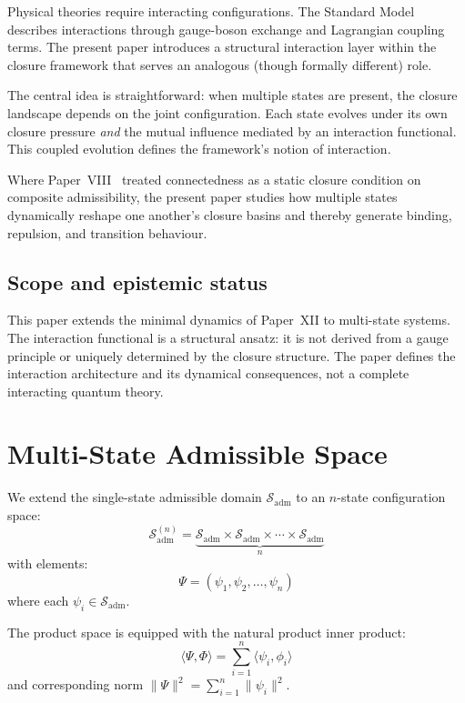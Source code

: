 \documentclass[12pt]{article}
\newcommand{\Sadm}{\mathcal{S}_{\mathrm{adm}}}
\begin{document}
Physical theories require interacting configurations. The Standard Model describes interactions through gauge-boson exchange and Lagrangian coupling terms. The present paper introduces a structural interaction layer within the closure framework that serves an analogous (though formally different) role.

The central idea is straightforward: when multiple states are present, the closure landscape depends on the joint configuration. Each state evolves under its own closure pressure \textit{and} the mutual influence mediated by an interaction functional. This coupled evolution defines the framework's notion of interaction.

Where Paper~VIII~\citep{SmartVIII} treated connectedness as a static closure condition on composite admissibility, the present paper studies how multiple states dynamically reshape one another's closure basins and thereby generate binding, repulsion, and transition behaviour.

\subsection*{Scope and epistemic status}

This paper extends the minimal dynamics of Paper~XII to multi-state systems. The interaction functional is a structural ansatz: it is not derived from a gauge principle or uniquely determined by the closure structure. The paper defines the interaction architecture and its dynamical consequences, not a complete interacting quantum theory.

\section{Multi-State Admissible Space}\label{sec:multistate}

We extend the single-state admissible domain $\Sadm$ to an $n$-state configuration space:
\begin{equation}\label{eq:productspace}
    \Sadm^{(n)} = \underbrace{\Sadm \times \Sadm \times \cdots \times \Sadm}_{n}
\end{equation}
with elements:
\begin{equation}
    \Psi = (\psi_1, \psi_2, \ldots, \psi_n)
\end{equation}
where each $\psi_i \in \Sadm$.

The product space is equipped with the natural product inner product:
\begin{equation}
    \langle\Psi, \Phi\rangle = \sum_{i=1}^n \langle\psi_i, \phi_i\rangle
\end{equation}
and corresponding norm $\|\Psi\|^2 = \sum_{i=1}^n \|\psi_i\|^2$.
\end{document}
